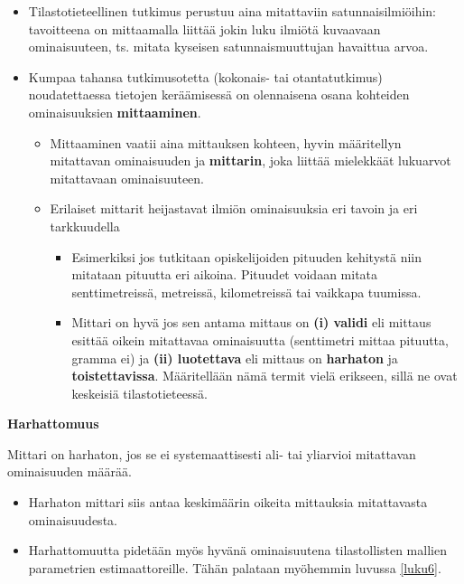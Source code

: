 \documentclass[
]{book}
\providecommand{\tightlist}{%
  \setlength{\itemsep}{0pt}\setlength{\parskip}{0pt}}
\begin{document}
\begin{itemize}
\item
  Tilastotieteellinen tutkimus perustuu aina mitattaviin satunnaisilmiöihin: tavoitteena on mittaamalla liittää jokin luku ilmiötä kuvaavaan ominaisuuteen, ts. mitata kyseisen satunnaismuuttujan havaittua arvoa.
\item
  Kumpaa tahansa tutkimusotetta (kokonais- tai otantatutkimus) noudatettaessa tietojen keräämisessä on olennaisena osana kohteiden ominaisuuksien \textbf{mittaaminen}.

  \begin{itemize}
  \tightlist
  \item
    Mittaaminen vaatii aina mittauksen kohteen, hyvin määritellyn mitattavan ominaisuuden ja \textbf{mittarin}, joka liittää mielekkäät lukuarvot mitattavaan ominaisuuteen.
  \item
    Erilaiset mittarit heijastavat ilmiön ominaisuuksia eri tavoin ja eri tarkkuudella

    \begin{itemize}
    \tightlist
    \item
      Esimerkiksi jos tutkitaan opiskelijoiden pituuden kehitystä niin mitataan pituutta eri aikoina. Pituudet voidaan mitata senttimetreissä, metreissä, kilometreissä tai vaikkapa tuumissa.
    \item
      Mittari on hyvä jos sen antama mittaus on \textbf{(i) validi} eli mittaus esittää oikein mitattavaa ominaisuutta (senttimetri mittaa pituutta, gramma ei) ja \textbf{(ii) luotettava} eli mittaus on \textbf{harhaton} ja \textbf{toistettavissa}. Määritellään nämä termit vielä erikseen, sillä ne ovat keskeisiä tilastotieteessä.
    \end{itemize}
  \end{itemize}
\end{itemize}

\begin{noteblock}{}
\textbf{Harhattomuus}

Mittari on harhaton, jos se ei systemaattisesti ali- tai yliarvioi mitattavan ominaisuuden määrää.

\end{noteblock}

\begin{itemize}
\item
  Harhaton mittari siis antaa keskimäärin oikeita mittauksia mitattavasta ominaisuudesta.
\item
  Harhattomuutta pidetään myös hyvänä ominaisuutena tilastollisten mallien parametrien estimaattoreille. Tähän palataan myöhemmin luvussa \ref{luku6}.
\end{itemize}
\end{document}

